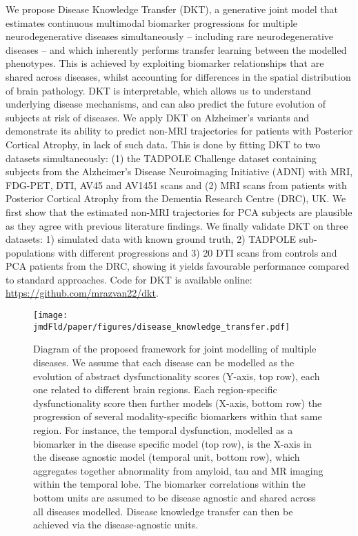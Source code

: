 We propose Disease Knowledge Transfer (DKT), a generative joint model that estimates continuous multimodal biomarker progressions for multiple neurodegenerative diseases simultaneously -- including rare neurodegenerative diseases -- and which inherently performs transfer learning between the modelled phenotypes. This is achieved by exploiting biomarker relationships that are shared across diseases, whilst accounting for differences in the spatial distribution of brain pathology. DKT is interpretable, which allows us to understand underlying disease mechanisms, and can also predict the future evolution of subjects at risk of diseases. We apply DKT on Alzheimer's variants and demonstrate its ability to predict non-MRI trajectories for patients with Posterior Cortical Atrophy, in lack of such data. This is done by fitting DKT to two datasets simultaneously: (1) the TADPOLE Challenge \cite{marinescu2018tadpole} dataset containing subjects from the Alzheimer's Disease Neuroimaging Initiative (ADNI) with MRI, FDG-PET, DTI, AV45 and AV1451 scans and (2) MRI scans from patients with Posterior Cortical Atrophy from the Dementia Research Centre (DRC), UK. We first show that the estimated non-MRI trajectories for PCA subjects are plausible as they agree with previous literature findings. We finally validate DKT on three datasets: 1) simulated data with known ground truth, 2) TADPOLE sub-populations with different progressions and 3) 20 DTI scans from controls and PCA patients from the DRC, showing it yields favourable performance compared to standard approaches. Code for DKT is available online: \url{https://github.com/mrazvan22/dkt}.


\begin{figure}[h]
 \centering
 \texttt{[image: \\jmdFld/paper/figures/disease\_knowledge\_transfer.pdf]}
 \caption[Diagram of the proposed framework for joint modelling of multiple diseases.]{Diagram of the proposed framework for joint modelling of multiple diseases. We assume that each disease can be modelled as the evolution of abstract dysfunctionality scores (Y-axis, top row), each one related to different brain regions. Each region-specific dysfunctionality score then further models (X-axis, bottom row) the progression of several modality-specific biomarkers within that same region. For instance, the temporal dysfunction, modelled as a biomarker in the disease specific model (top row), is the X-axis in the disease agnostic model (temporal unit, bottom row), which aggregates together abnormality from amyloid, tau and MR imaging within the temporal lobe. The biomarker correlations within the bottom units are assumed to be disease agnostic and shared across all diseases modelled. Disease knowledge transfer can then be achieved via the disease-agnostic units.}
 \label{fig:diagram}
\end{figure}

